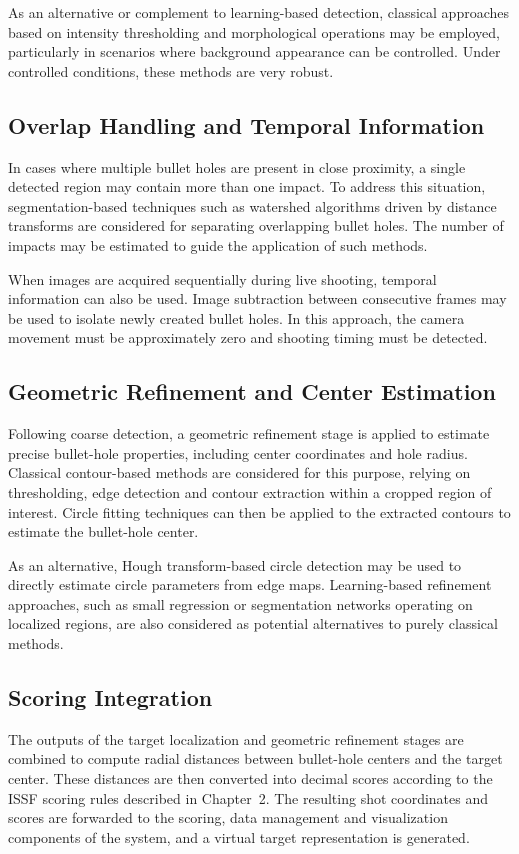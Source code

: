 As an alternative or complement to learning-based detection, classical approaches based on
intensity thresholding and morphological operations may be employed, particularly in scenarios
where background appearance can be controlled. Under controlled conditions, these methods are very robust.

\subsection*{Overlap Handling and Temporal Information}

In cases where multiple bullet holes are present in close proximity, a single detected region may
contain more than one impact. To address this situation, segmentation-based techniques such as
watershed algorithms driven by distance transforms are considered for separating overlapping
bullet holes. The number of impacts may be estimated to guide the
application of such methods.

When images are acquired sequentially during live shooting, temporal information can also be
used. Image subtraction between consecutive frames may be used to isolate newly created
bullet holes. In this approach, the camera movement must be approximately zero and shooting timing
must be detected.

\subsection*{Geometric Refinement and Center Estimation}

Following coarse detection, a geometric refinement stage is applied to estimate precise bullet-hole
properties, including center coordinates and hole radius. Classical contour-based methods are
considered for this purpose, relying on thresholding, edge detection and contour extraction within
a cropped region of interest. Circle fitting techniques can then be applied to the extracted
contours to estimate the bullet-hole center.

As an alternative, Hough transform-based circle detection may be used to directly estimate
circle parameters from edge maps. Learning-based refinement approaches, such as small regression
or segmentation networks operating on localized regions, are also considered as potential
alternatives to purely classical methods.

\subsection*{Scoring Integration}

The outputs of the target localization and geometric refinement stages are combined to compute
radial distances between bullet-hole centers and the target center. These distances are then
converted into decimal scores according to the ISSF scoring rules described in Chapter~2. The
resulting shot coordinates and scores are forwarded to the scoring, data management and
visualization components of the system, and a virtual target representation is generated.


